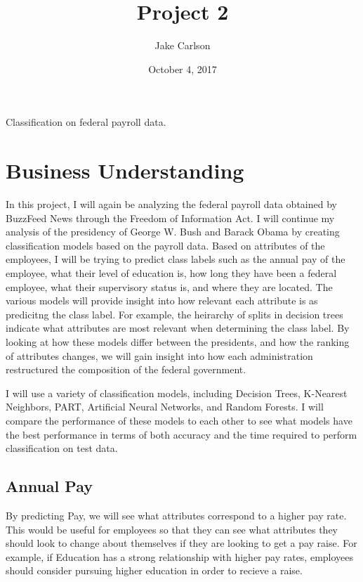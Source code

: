 \documentclass{article}
\begin{document}
\title{Project 2}
\author{Jake Carlson}
\date{October 4, 2017}
\maketitle

\abstract
Classification on federal payroll data.
\newpage

\tableofcontents
\newpage

\section{Business Understanding}
In this project, I will again be analyzing the federal payroll data obtained by BuzzFeed News through the Freedom of Information Act. I will continue my analysis of the presidency of George W. Bush and Barack Obama by creating classification models based on the payroll data. Based on attributes of the employees, I will be trying to predict class labels such as the annual pay of the employee, what their level of education is, how long they have been a federal employee, what their supervisory status is, and where they are located. The various models will provide insight into how relevant each attribute is as predicitng the class label. For example, the heirarchy of splits in decision trees indicate what attributes are most relevant when determining the class label. By looking at how these models differ between the presidents, and how the ranking of attributes changes, we will gain insight into how each administration restructured the composition of the federal government.
\par
I will use a variety of classification models, including Decision Trees, K-Nearest Neighbors, PART, Artificial Neural Networks, and Random Forests. I will compare the performance of these models to each other to see what models have the best performance in terms of both accuracy and the time required to perform classification on test data.

    \subsection{Annual Pay}
    By predicting Pay, we will see what attributes correspond to a higher pay rate. This would be useful for employees so that they can see what attributes they should look to change about themselves if they are looking to get a pay raise. For example, if Education has a strong relationship with higher pay rates, employees should consider pursuing higher education in order to recieve a raise.
\end{document}
